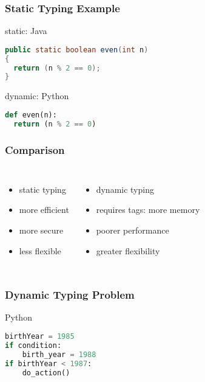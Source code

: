 \documentclass[dvipsnames]{beamer}
\theoremstyle{plain}
\begin{document}
\begin{frame}[fragile]
  \frametitle{Static Typing Example}

  \begin{exampleblock}{static: Java}
    \begin{lstlisting}[language=Java]
public static boolean even(int n)
{
  return (n % 2 == 0);
}
    \end{lstlisting}
  \end{exampleblock}

  \begin{exampleblock}{dynamic: Python}
    \begin{lstlisting}[language=Python]
def even(n):
  return (n % 2 == 0)
    \end{lstlisting}
  \end{exampleblock}
\end{frame}

\begin{frame}
  \frametitle{Comparison}

  \begin{columns}[t]
    \begin{itemize}
      \item static typing
      \smallskip
      \item more efficient
      \item more secure
      \item less flexible
    \end{itemize}

    \begin{itemize}
      \item dynamic typing
      \smallskip
      \item requires tags: more memory
      \item poorer performance
      \item greater flexibility
    \end{itemize}
  \end{columns}
\end{frame}

\begin{frame}[fragile]
  \frametitle{Dynamic Typing Problem}

  \begin{exampleblock}{Python}
    \begin{lstlisting}[language=Python]
birthYear = 1985
if condition:
    birth_year = 1988
if birthYear < 1987:
    do_action()
    \end{lstlisting}
  \end{exampleblock}
\end{frame}
\end{document}
